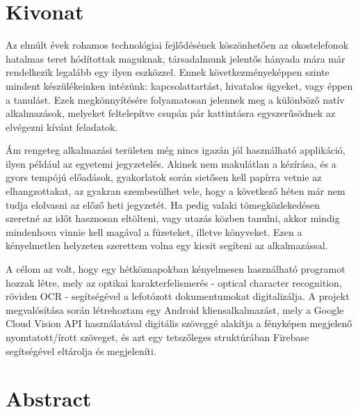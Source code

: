 \setcounter{page}{1}

\selecthungarian

\chapter*{Kivonat}

Az elmúlt évek rohamos technológiai fejlődésének köszönhetően az okostelefonok hatalmas teret hódítottak maguknak, társadalmunk jelentős hányada mára már rendelkezik legalább egy ilyen eszközzel. Ennek következményeképpen szinte mindent készülékeinken intézünk: kapcsolattartást, hivatalos ügyeket, vagy éppen a tanulást. Ezek megkönnyítésére folyamatosan jelennek meg a különböző natív alkalmazások, melyeket feltelepítve csupán pár kattintásra egyszerűsödnek az elvégezni kívánt feladatok. 

Ám rengeteg alkalmazási területen még nincs igazán jól használható applikáció, ilyen például az egyetemi jegyzetelés. Akinek nem makulátlan a kézírása, és a gyors tempójú előadások, gyakorlatok során sietősen kell papírra vetnie az elhangzottakat, az gyakran szembesülhet vele, hogy a következő héten már nem tudja elolvasni az előző heti jegyzetét. Ha pedig valaki tömegközlekedésen szeretné az időt hasznosan eltölteni, vagy utazás közben tanulni, akkor mindig mindenhova vinnie kell magával a füzeteket, illetve könyveket. Ezen a kényelmetlen helyzeten szerettem volna egy kicsit segíteni az alkalmazással. 

A célom az volt, hogy egy hétköznapokban kényelmesen használható programot hozzak létre, mely az optikai karakterfelismerés - optical character recognition, röviden OCR - segítségével a lefotózott dokumentumokat digitalizálja. A projekt megvalósítása során létrehoztam egy Android kliensalkalmazást, mely a Google Cloud Vision API használatával digitális szöveggé alakítja a fényképen megjelenő nyomtatott/írott szöveget, és azt egy tetszőleges struktúrában Firebase segítségével eltárolja és megjeleníti. 

\vfill
\selectenglish


\chapter*{Abstract}

